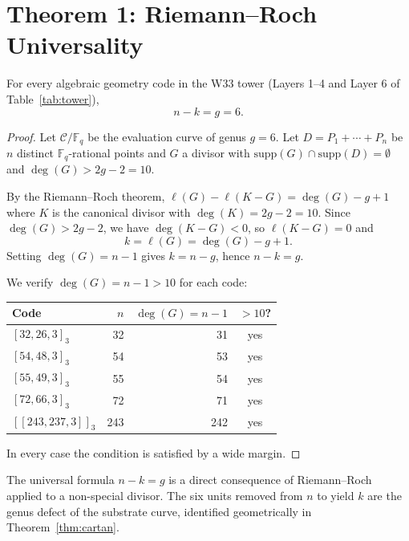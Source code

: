 
\section{Theorem 1: Riemann--Roch Universality}\label{sec:rr}

\begin{theorem}\label{thm:rr}
For every algebraic geometry code in the W33 tower
(Layers 1--4 and Layer 6 of Table~\ref{tab:tower}),
\[
 n - k = g = 6.
\]
\end{theorem}

\begin{proof}
Let $\mathcal{C}/\mathbb{F}_q$ be the evaluation curve of genus $g = 6$.
Let $D = P_1 + \cdots + P_n$ be $n$ distinct $\mathbb{F}_q$-rational points
and $G$ a divisor with $\mathrm{supp}(G) \cap \mathrm{supp}(D) = \emptyset$
and $\deg(G) > 2g - 2 = 10$.

By the Riemann--Roch theorem,
$\ell(G) - \ell(K-G) = \deg(G) - g + 1$
where $K$ is the canonical divisor with $\deg(K) = 2g-2 = 10$.
Since $\deg(G) > 2g-2$, we have $\deg(K-G) < 0$, so $\ell(K-G)=0$ and
\[
k = \ell(G) = \deg(G) - g + 1.
\]
Setting $\deg(G) = n-1$ gives $k = n - g$, hence $n-k = g$.

We verify $\deg(G) = n-1 > 10$ for each code:
\begin{center}
\begin{tabular}{lrrc}
\hline
Code & $n$ & $\deg(G)=n-1$ & $>10$?\\
\hline
$[32,26,3]_3$ & 32 & 31 & yes \\
$[54,48,3]_3$ & 54 & 53 & yes \\
$[55,49,3]_3$ & 55 & 54 & yes \\
$[72,66,3]_3$ & 72 & 71 & yes \\
$[[243,237,3]]_3$ & 243 & 242 & yes \\
\hline
\end{tabular}
\end{center}
In every case the condition is satisfied by a wide margin.\end{proof}

\begin{remark}
The universal formula $n-k=g$ is a direct consequence of Riemann--Roch
applied to a non-special divisor. The six units removed from $n$ to yield $k$
are the genus defect of the substrate curve, identified geometrically
in Theorem~\ref{thm:cartan}.
\end{remark}

